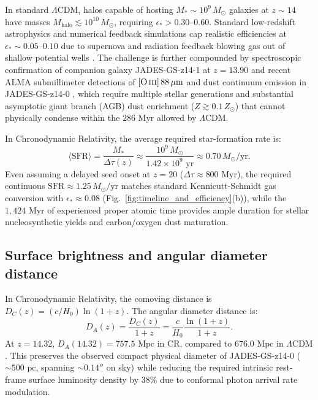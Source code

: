 \documentclass[aps,prd,reprint,superscriptaddress,nofootinbib,floatfix,amsmath,amssymb]{revtex4-2}
\begin{document}
In standard $\Lambda\text{CDM}$, halos capable of hosting $M_* \sim 10^9\,M_\odot$ galaxies at $z \sim 14$ have masses $M_{\text{halo}} \lesssim 10^{10}\,M_\odot$, requiring $\epsilon_* > 0.30\text{--}0.60$. Standard low-redshift astrophysics and numerical feedback simulations cap realistic efficiencies at $\epsilon_* \sim 0.05\text{--}0.10$ due to supernova and radiation feedback blowing gas out of shallow potential wells \cite{BoylanKolchin2023_Stress,Ferrara2023_Bright}. The challenge is further compounded by spectroscopic confirmation of companion galaxy JADES-GS-z14-1 at $z = 13.90$ \cite{Carniani2024_JADES} and recent ALMA submillimeter detections of $[\text{O}\,\textsc{iii}]\,88\,\mu\text{m}$ and dust continuum emission in JADES-GS-z14-0 \cite{Carniani2025_ALMA_Oxygen}, which require multiple stellar generations and substantial asymptotic giant branch (AGB) dust enrichment ($Z \gtrsim 0.1\,Z_\odot$) that cannot physically condense within the $286\text{ Myr}$ allowed by $\Lambda\text{CDM}$.

In Chronodynamic Relativity, the average required star-formation rate is:
\begin{equation}
\langle \text{SFR} \rangle = \frac{M_*}{\Delta\tau(z)} \approx \frac{10^9\,M_\odot}{1.42 \times 10^9\text{ yr}} \approx 0.70\,M_\odot/\text{yr}.
\label{eq:sfr_cr}
\end{equation}
Even assuming a delayed seed onset at $z = 20$ ($\Delta\tau \approx 800\text{ Myr}$), the required continuous $\text{SFR} \approx 1.25\,M_\odot/\text{yr}$ matches standard Kennicutt-Schmidt gas conversion with $\epsilon_* \approx 0.08$ (Fig.~\ref{fig:timeline_and_efficiency}(b)), while the $1,424\text{ Myr}$ of experienced proper atomic time provides ample duration for stellar nucleosynthetic yields and carbon/oxygen dust maturation.

\subsection{Surface brightness and angular diameter distance}

In Chronodynamic Relativity, the comoving distance is $D_C(z) = (c/H_0)\ln(1+z)$. The angular diameter distance is:
\begin{equation}
D_A(z) = \frac{D_C(z)}{1+z} = \frac{c}{H_0} \frac{\ln(1+z)}{1+z}.
\label{eq:da_cr}
\end{equation}
At $z = 14.32$, $D_A(14.32) = 757.5\text{ Mpc}$ in CR, compared to $676.0\text{ Mpc}$ in $\Lambda\text{CDM}$. This preserves the observed compact physical diameter of JADES-GS-z14-0 ($\sim 500\text{ pc}$, spanning $\sim 0.14''$ on sky) while reducing the required intrinsic rest-frame surface luminosity density by $38\%$ due to conformal photon arrival rate modulation.
\end{document}
